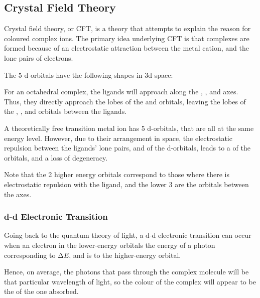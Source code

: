 		\subsection{Crystal Field Theory}

			Crystal field theory, or CFT, is a theory that attempts to explain the reason for coloured complex ions. The primary idea
			underlying CFT is that complexes are formed because of an electrostatic attraction between the metal cation, and the lone
			pairs of electrons.

			The 5 d-orbitals have the following shapes in 3d space:


			For an octahedral complex, the ligands will approach along the , , and  axes. Thus, they directly approach
			the lobes of the  and  orbitals, leaving the lobes of the ,
			, and  orbitals between the ligands.

			A theoretically free transition metal ion has 5  d-orbitals, that are all at the same energy level. However, due
			to their arrangement in space, the electrostatic repulsion between the ligands' lone pairs, and  of the d-orbitals,
			leads to a  of the orbitals, and a loss of degeneracy.


			Note that the 2 higher energy orbitals correspond to those where there is electrostatic repulsion with the ligand, and the lower
			3 are the orbitals between the axes.

			\pagebreak
			\subsubsection{d-d Electronic Transition}

				Going back to the quantum theory of light, a d-d electronic transition can occur when an electron in the lower-energy orbitals
				 the energy of a photon corresponding to $∆E$, and is  to the higher-energy orbital.

				Hence, on average, the photons that pass through the complex molecule will be  that particular wavelength of
				light, so the colour of the complex will appear to be the  of the one absorbed.

